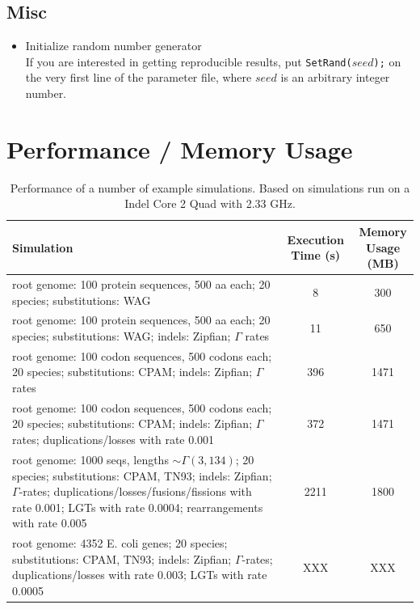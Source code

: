 \documentclass[11pt]{article}
\begin{document}
\subsection{Misc}
\begin{itemize}
\item{Initialize random number generator} \hfill \\
If you are interested in getting reproducible results, put \texttt{SetRand(}$seed$\texttt{);} on the very first line of the parameter file, where $seed$ is an arbitrary integer number.
\end{itemize}

\section{Performance / Memory Usage}

\begin{table}[htp]
\begin{center}
\begin{footnotesize}
\begin{tabular}{lcc}
\hline
\bf{Simulation}            & \parbox{2cm}{\bf{Execution Time (s)}}        & \parbox{2.0cm}{\bf{Memory\\ Usage (MB)}} \\
\hline
\parbox{7.3cm}{root genome: 100 protein sequences, 500 aa each; 20 species; substitutions: WAG} & 8 & 300 \\
\hline
\parbox{7.3cm}{root genome: 100 protein sequences, 500 aa each; 20 species; substitutions: WAG; indels: Zipfian; $\Gamma$ rates} & 11 & 650 \\
\hline
\parbox{7.3cm}{root genome: 100 codon sequences, 500 codons each; 20 species; substitutions: CPAM; indels: Zipfian; $\Gamma$ rates} & 396 & 1471 \\
\hline
\parbox{7.3cm}{root genome: 100 codon sequences, 500 codons each; 20 species; substitutions: CPAM; indels: Zipfian; $\Gamma$ rates; duplications/losses with rate 0.001} & 372 & 1471 \\
\hline
\parbox{7.3cm}{root genome: 1000 seqs, lengths $\sim\Gamma(3,134)$; 20 species; substitutions: CPAM, TN93; indels: Zipfian; $\Gamma$-rates; duplications/losses/fusions/fissions with rate 0.001; LGTs with rate 0.0004; rearrangements with rate 0.005} & 2211 & 1800 \\
\hline
\parbox{7.3cm}{root genome: 4352 E. coli genes; 20 species; substitutions: CPAM, TN93; indels: Zipfian; $\Gamma$-rates; duplications/losses with rate 0.003; LGTs with rate 0.0005} & XXX & XXX \\

\hline
\end{tabular}
\end{footnotesize} %
\end{center}
\caption{Performance of a number of example simulations. Based on simulations run on a Indel Core 2 Quad with 2.33 GHz.}
\label{tab.performance}
\end{table}




\end{document}
